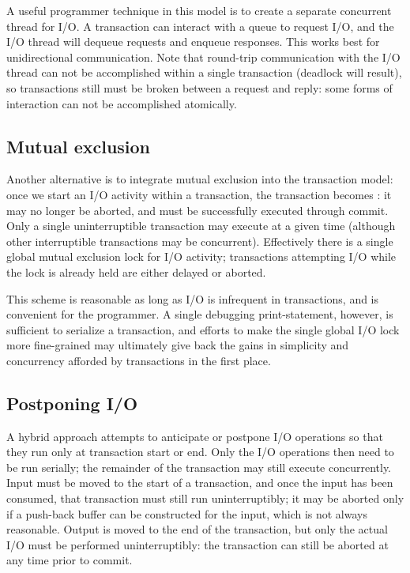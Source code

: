 A useful programmer technique in this model is to create a separate concurrent
thread for I/O.  A transaction can interact with a queue to request
I/O, and the I/O thread will dequeue requests and enqueue responses.
This works best for unidirectional communication.  Note that
round-trip communication with the I/O thread can not be accomplished
within a single transaction (deadlock will result), so transactions
still must be broken between a request and reply: some forms of
interaction can not be accomplished atomically.

\subsection{Mutual exclusion}
Another alternative is to integrate mutual exclusion into the
transaction model: once we start an I/O activity within a transaction,
the transaction becomes : it may no longer be
aborted, and must be successfully executed through commit.
Only a single uninterruptible transaction may execute at a given time
(although other interruptible transactions may be concurrent).
Effectively there is a single global mutual exclusion lock for I/O
activity; transactions attempting I/O while the lock is already held
are either delayed or aborted.

This scheme is reasonable as long as I/O is infrequent in
transactions, and is convenient for the programmer.
A single debugging print-statement, however, is sufficient to
serialize a transaction, and efforts to make the single global I/O
lock more fine-grained may ultimately give back the gains in
simplicity and concurrency afforded by transactions in the first place.

\subsection{Postponing I/O}
A hybrid approach attempts to anticipate or postpone I/O operations so
that they run only at transaction start or end.
Only the I/O operations then need to be run serially; the remainder of
the transaction may still execute concurrently.  Input must be moved
to the start of a transaction, and once the input has been consumed,
that transaction must still run uninterruptibly; it may be aborted
only if a push-back buffer can be constructed for the input, which is
not always reasonable.  Output is moved to the end of the transaction,
but only the actual I/O must be performed uninterruptibly: the
transaction can still be aborted at any time prior to commit.

